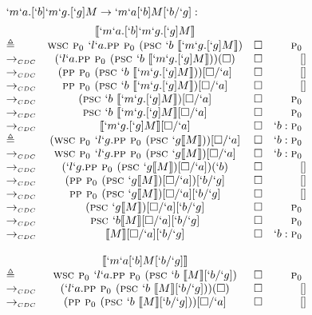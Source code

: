 \begin{Proof}
\[
\begin{array}{lcrr}
  \prooflabel{`m`a.[`b]`m`g.[`g]M \to `m`a[`b]M[`b/`g]} \\
             & \tr{`m`a.[`b]`m`g.[`g]M} \\
  \triangleq & \wsc \gp `l`a.\pp \gp (\psc `b\ \tr{`m`g.[`g]M})     & \square & \gp        \\
  \tocdc\    & (`l`a.\pp \gp (\psc `b\ \tr{`m`g.[`g]M}))(\square)   & \square & []         \\
  \tocdc\    & (\pp \gp (\psc `b\ \tr{`m`g.[`g]M}))[\square/`a]     & \square & []         \\
  \tocdc\    & \pp \gp (\psc `b\ \tr{`m`g.[`g]M})[\square/`a]       & \square & []         \\
  \tocdc\    & (\psc `b\ \tr{`m`g.[`g]M})[\square/`a]               & \square & \gp        \\
  \tocdc\    & \psc `b\ \tr{`m`g.[`g]M}[\square/`a]                 & \square & \gp        \\
  \tocdc\    & \tr{`m`g.[`g]M}[\square/`a]                          & \square & `b:\gp  \\
  \triangleq & (\wsc \gp `l`g.\pp \gp (\psc `g \tr{M}))[\square/`a] & \square & `b:\gp  \\
  \tocdc\    & \wsc \gp `l`g.\pp \gp (\psc `g \tr{M})[\square/`a]   & \square & `b:\gp  \\
  \tocdc\    & (`l`g.\pp \gp (\psc `g \tr{M})[\square/`a])(`b)      & \square & []  \\
  \tocdc\    & (\pp \gp (\psc `g \tr{M})[\square/`a])[`b/`g]        & \square & []  \\
  \tocdc\    & \pp \gp (\psc `g \tr{M})[\square/`a][`b/`g]          & \square & []  \\
  \tocdc\    & (\psc `g \tr{M})[\square/`a][`b/`g]                  & \square & \gp  \\
  \tocdc\    & \psc `b \tr{M}[\square/`a][`b/`g]                    & \square & \gp  \\
  \tocdc\    & \tr{M}[\square/`a][`b/`g]                            & \square & `b:\gp  \\
  \\
             & \tr{`m`a[`b]M[`b/`g]} \\
  \triangleq & \wsc \gp `l`a.\pp \gp (\psc `b\ \tr{M}[`b/`g])   & \square & \gp       \\
  \tocdc\     & (`l`a.\pp \gp (\psc `b\ \tr{M}[`b/`g]))(\square) & \square & []        \\
  \tocdc\     & (\pp \gp (\psc `b\ \tr{M}[`b/`g]))[\square/`a]   & \square & []        \\

\end{array}\]
\end{Proof}
